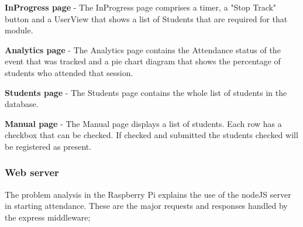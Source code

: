\textbf{InProgress page} - 
The InProgress page comprises a timer, a "Stop Track" button and a UserView that shows a list of Students that are required for that module.

\textbf{Analytics page} - 
The Analytics page contains the Attendance status of the event that was tracked and a pie chart diagram that shows the percentage of students who attended that session.

\textbf{Students page} - 
The Students page contains the whole list of students in the database.

\textbf{Manual page} - 
The Manual page displays a list of students. Each row has a checkbox that can be checked. If checked and submitted the students checked will be registered as present.
\subsubsection*{Web server}
The problem analysis in the Raspberry Pi explains the use of the nodeJS server in starting attendance. These are the major requests and responses handled by the express middleware;
